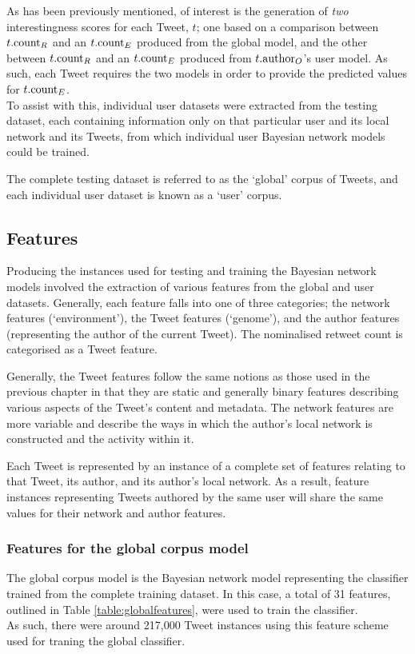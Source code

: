As has been previously mentioned, of interest is the generation of \textit{two} interestingness scores for each Tweet, $t$; one based on a comparison between $t.\textrm{count}_R$ and an $t.\textrm{count}_E$ produced from the global model, and the other between $t.\textrm{count}_R$ and an $t.\textrm{count}_E$ produced from $t.\textrm{author}_O$'s user model. As such, each Tweet requires the two models in order to provide the predicted values for $t.\textrm{count}_E$.\\
To assist with this, individual user datasets were extracted from the testing dataset, each containing information only on that particular user and its local network and its Tweets, from which individual user Bayesian network models could be trained.

The complete testing dataset is referred to as the `global' corpus of Tweets, and each individual user dataset is known as a `user' corpus.



\subsection{Features}
Producing the instances used for testing and training the Bayesian network models involved the extraction of various features from the global and user datasets. Generally, each feature falls into one of three categories; the network features (`environment'), the Tweet features (`genome'), and the author features (representing the author of the current Tweet). The nominalised retweet count is categorised as a Tweet feature.

Generally, the Tweet features follow the same notions as those used in the previous chapter in that they are static and generally binary features describing various aspects of the Tweet's content and metadata. The network features are more variable and describe the ways in which the author's local network is constructed and the activity within it.

Each Tweet is represented by an instance of a complete set of features relating to that Tweet, its author, and its author's local network. As a result, feature instances representing Tweets authored by the same user will share the same values for their network and author features.


\subsubsection{Features for the global corpus model}
The global corpus model is the Bayesian network model representing the classifier trained from the complete training dataset. In this case, a total of 31 features, outlined in Table \ref{table:globalfeatures}, were used to train the classifier.\\
As such, there were around 217,000 Tweet instances using this feature scheme used for traning the global classifier.

